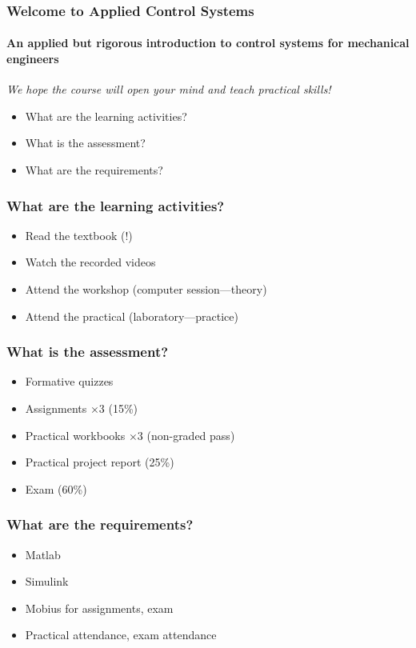 \documentclass[10pt]{beamer-control}
\begin{document}

\begin{frame}[plain]
  \def\currCONCEPT{Welcome!}
  \def\insertsubsectionnumber{0}
\end{frame}

\begin{frame}
  \frametitle{Welcome to Applied Control Systems}
  \framesubtitle{An applied but rigorous introduction to control systems for mechanical engineers}

  \emph{We hope the course will open your mind and teach practical skills!}
  \bigskip

  \begin{itemize}
    \item What are the learning activities?
    \item What is the assessment?
    \item What are the requirements?
  \end{itemize}
\end{frame}

\begin{frame}
  \frametitle{What are the learning activities?}
  \begin{itemize}
    \item Read the textbook (!)
    \item Watch the recorded videos
    \item Attend the workshop (computer session---theory)
    \item Attend the practical (laboratory---practice)
  \end{itemize}
\end{frame}


\begin{frame}
  \frametitle{What is the assessment?}
  \begin{itemize}
    \item Formative quizzes
    \item Assignments $\times$3 (15\%)
    \item Practical workbooks $\times3$ (non-graded pass)
    \item Practical project report (25\%)
    \item Exam (60\%)
  \end{itemize}
\end{frame}

\begin{frame}
  \frametitle{What are the requirements?}
  \begin{itemize}
    \item Matlab
    \item Simulink
    \item Mobius for assignments, exam
    \item Practical attendance, exam attendance
  \end{itemize}
\end{frame}
\end{document}
